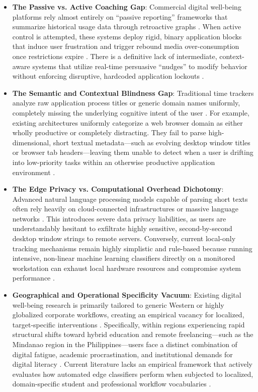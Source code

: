 \documentclass[conference]{IEEEtran}
\begin{document}
\begin{itemize}
    \item \textbf{The Passive vs. Active Coaching Gap}: Commercial digital well-being platforms rely almost entirely on ``passive reporting'' frameworks that summarize historical usage data through retroactive graphs \cite{Abhari2022}. When active control is attempted, these systems deploy rigid, binary application blocks that induce user frustration and trigger rebound media over-consumption once restrictions expire \cite{Mark2023, Lally2013}. There is a definitive lack of intermediate, context-aware systems that utilize real-time persuasive ``nudges'' to modify behavior without enforcing disruptive, hardcoded application lockouts \cite{Thaler2021, Fogg2009}.
    \item \textbf{The Semantic and Contextual Blindness Gap}: Traditional time trackers analyze raw application process titles or generic domain names uniformly, completely missing the underlying cognitive intent of the user \cite{Qiao2023}. For example, existing architectures uniformly categorize a web browser domain as either wholly productive or completely distracting. They fail to parse high-dimensional, short textual metadata—such as evolving desktop window titles or browser tab headers—leaving them unable to detect when a user is drifting into low-priority tasks within an otherwise productive application environment \cite{Sitaula2022}.
    \item \textbf{The Edge Privacy vs. Computational Overhead Dichotomy}: Advanced natural language processing models capable of parsing short texts often rely heavily on cloud-connected infrastructures or massive language networks \cite{Murrar2025}. This introduces severe data privacy liabilities, as users are understandably hesitant to exfiltrate highly sensitive, second-by-second desktop window strings to remote servers. Conversely, current local-only tracking mechanisms remain highly simplistic and rule-based because running intensive, non-linear machine learning classifiers directly on a monitored workstation can exhaust local hardware resources and compromise system performance \cite{Cahyani2021, MesaJimenez2022}.
    \item \textbf{Geographical and Operational Specificity Vacuum}: Existing digital well-being research is primarily tailored to generic Western or highly globalized corporate workflows, creating an empirical vacancy for localized, target-specific interventions \cite{Allam2025}. Specifically, within regions experiencing rapid structural shifts toward hybrid education and remote freelancing—such as the Mindanao region in the Philippines—users face a distinct combination of digital fatigue, academic procrastination, and institutional demands for digital literacy \cite{DepEdDavao2025, Geronimo2025, Tecson2026}. Current literature lacks an empirical framework that actively evaluates how automated edge classifiers perform when subjected to localized, domain-specific student and professional workflow vocabularies \cite{Murrar2025, Khan2022}.
\end{itemize}
\end{document}
